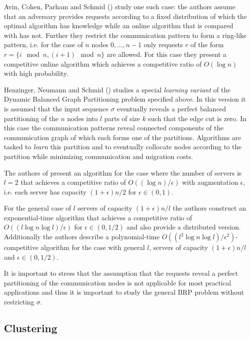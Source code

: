 \documentclass[a4paper,xcolor=dvipsnames, tikz, 12pt]{article}
\newcommand{\opt}{\text{O{\scriptsize PT}}}
\theoremstyle{definition}
\begin{document}
	Avin, Cohen, Parham and Schmid (\cite{Avin2018}) study one such case: the authors assume that an adversary provides requests according to a fixed distribution of which the optimal algorithm \opt{} has knowledge while an online algorithm that is compared with \opt{} has not. Further they restrict the communication pattern to form a ring-like pattern, i.e. for the case of $n$ nodes $0,...,n-1$ only requests $r$ of the form $r=\{i \mod n, (i+1)\mod n\}$ are allowed. For this case they present a competitive online algorithm which achieves a competitive ratio of $O(\log n)$ with high probability.	
	
	Henzinger, Neumann and Schmid (\cite{Henzinger2019}) studies a special \textit{learning variant} of the Dynamic Balanced Graph Partitioning problem specified above. In this version it is assumed that the input sequence $\sigma$ eventually reveals a perfect balanced partitioning of the $n$ nodes into $l$ parts of size $k$ such that the edge cut is zero. In this case the communication patterns reveal connected components of the communication graph of which each forms one of the partitions. Algorithms are tasked to \textit{learn} this partition and to eventually collocate nodes according to the partition while minimizing communication and migration costs.
	
	The authors of \cite{Henzinger2019} present an algorithm for the case where the number of servers is $l=2$ that achieves a competitive ratio of $O((\log n)/\epsilon)$ with augmentation $\epsilon$, i.e. each server has capacity $(1+\epsilon)n/2$ for $\epsilon\in(0,1)$.
	
	For the general case of $l$ servers of capacity $(1+\epsilon)n/l$ the authors construct an exponential-time algorithm that achieves a competitive ratio of $O((l\log n \log l)/\epsilon)$ for $\epsilon\in(0,1/2)$ and also provide a distributed version.
	Additionally the authors describe a polynomial-time $O((l^2\log n\log l)/\epsilon^2)$-competitive algorithm for the case with general $l$, servers of capacity $(1+\epsilon)n/l$ and $\epsilon\in(0,1/2)$.
	
	It is important to stress that the assumption that the requests reveal a perfect partitioning of the communication nodes is not applicable for most practical applications and thus it is important to study the general BRP problem without restricting $\sigma$.
	
	
	\subsection{Clustering}
	
\end{document}
